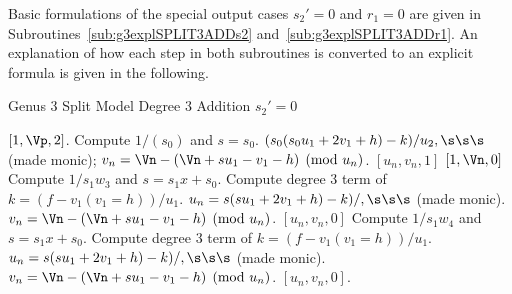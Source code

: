 Basic formulations of the special output cases $s_2' = 0$ and $r_1 = 0$ are given
in Subroutines~\ref{sub:g3explSPLIT3ADDs2} and~\ref{sub:g3explSPLIT3ADDr1}. An
explanation of how each step in both subroutines is converted to an explicit
formula is given in the following.

\begin{subroutine}
\caption{Genus 3 Split Model Degree 3 Addition $s_2' = 0$ \label{sub:g3explSPLIT3ADDs2}}
\begin{algorithmic} [1]
     \Return $[1,\Vp,2]$.
    \Else
        \State Compute $1/(s_0)$ and $s = s_0$.
        \State $(s_0(s_0u_1 + 2v_1 + h) - k)/u_2, \s\s\s$ (made monic);
        \State $v_n = \Vn - (\Vn + su_1 - v_1 - h) \pmod{u_n}$.
        \State \Return $[u_n,v_n,1]$
    \EndIf
\EndIf
{}
     \Return $[1,\Vn,0]$
    \Else
        \State Compute $1/s_1w_3$ and $s = s_1x + s_0$.
        \State Compute degree 3 term of $k = (f-v_1(v_1 = h))/u_1$.
        \State $u_n = s(su_1 + 2v_1 + h) - k)/, \s\s\s $ (made monic).
        \State $v_n = \Vn - (\Vn + su_1 - v_1 - h) \pmod{u_n}$.
        \State \Return $[u_n,v_n,0]$
    \EndIf
\EndIf
\State Compute $1/s_1w_4$ and $s = s_1x + s_0$.
\State Compute degree 3 term of $k = (f-v_1(v_1 = h))/u_1$.
\State $u_n = s(su_1 + 2v_1 + h) - k)/, \s\s\s $ (made monic).
\State $v_n = \Vn - (\Vn + su_1 - v_1 - h) \pmod{u_n}$.
\State \Return $[u_n,v_n,0]$.
\end{algorithmic}
\end{subroutine}


